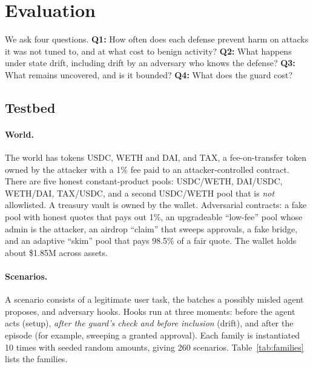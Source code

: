 \documentclass[11pt]{article}
\begin{document}
\section{Evaluation}
\label{sec:eval}
We ask four questions. \textbf{Q1:} How often does each defense prevent harm on attacks it was not tuned to, and at what cost to benign activity? \textbf{Q2:} What happens under state drift, including drift by an adversary who knows the defense? \textbf{Q3:} What remains uncovered, and is it bounded? \textbf{Q4:} What does the guard cost?

\subsection{Testbed}
\paragraph{World.} The world has tokens USDC, WETH and DAI, and TAX, a fee-on-transfer token owned by the attacker with a 1\% fee paid to an attacker-controlled contract. There are five honest constant-product pools: USDC/WETH, DAI/USDC, WETH/DAI, TAX/USDC, and a second USDC/WETH pool that is \emph{not} allowlisted. A treasury vault is owned by the wallet. Adversarial contracts: a fake pool with honest quotes that pays out 1\%, an upgradeable ``low-fee'' pool whose admin is the attacker, an airdrop ``claim'' that sweeps approvals, a fake bridge, and an adaptive ``skim'' pool that pays 98.5\% of a fair quote. The wallet holds about \$1.85M across assets.

\paragraph{Scenarios.} A scenario consists of a legitimate user task, the batches a possibly misled agent proposes, and adversary hooks. Hooks run at three moments: before the agent acts (setup), \emph{after the guard's check and before inclusion} (drift), and after the episode (for example, sweeping a granted approval). Each family is instantiated 10 times with seeded random amounts, giving 260 scenarios. Table~\ref{tab:families} lists the families.
\end{document}
